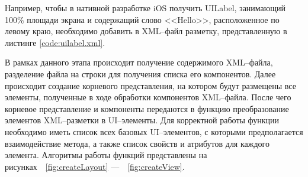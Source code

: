 Например, чтобы в нативной разработке iOS получить UILabel, занимающий 100\% площади экрана и содержащий слово <<Hello>>, расположенное по левому краю, необходимо добавить в XML--файл разметку, представленную в листинге \ref{code:uilabel.xml}.

В рамках данного этапа происходит получение содержимого XML--файла, разделение файла на строки для получения списка его компонентов.
Далее происходит создание корневого представления, на котором будут размещены все элементы, полученные в ходе обработки компонентов XML--файла.
После чего корневое представление и компоненты передаются в функцию преобразование элементов XML--разметки в UI--элементы.
Для корректной работы функции необходимо иметь список всех базовых UI--элементов, с которыми предполагается взаимодействие метода, а также список свойств и атрибутов для каждого элемента.
Алгоритмы работы функций представлены на рисунках~~\ref{fig:createLayout} ---~~\ref{fig:createView}.  

